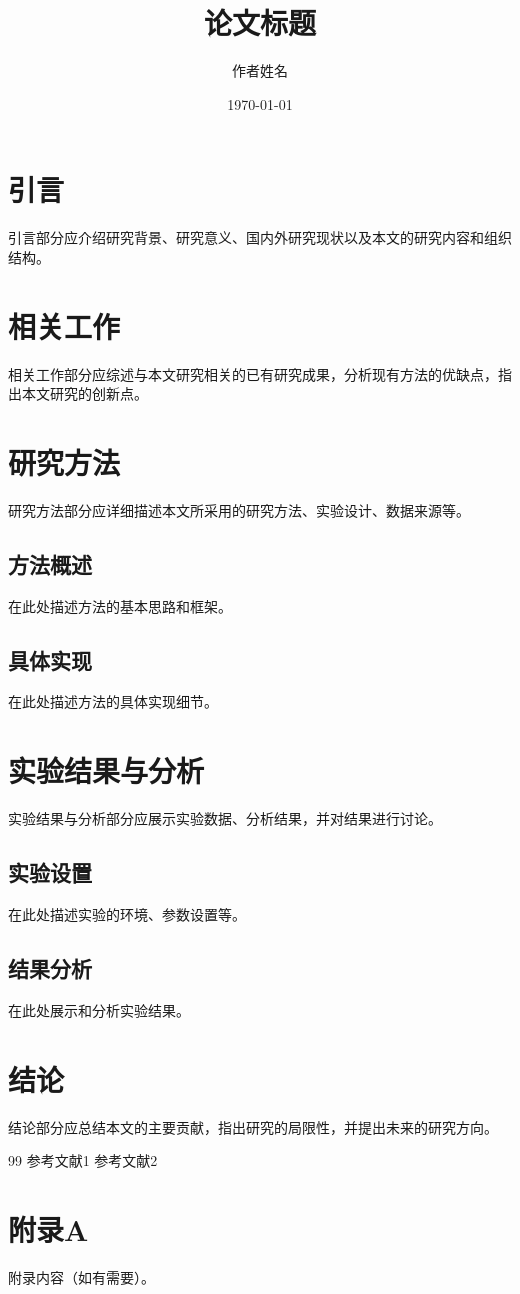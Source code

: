 \documentclass[12pt,a4paper,twocolumn]{article}
\title{论文标题}
\author{作者姓名}
\date{\today}
\begin{document}

\section{引言}
引言部分应介绍研究背景、研究意义、国内外研究现状以及本文的研究内容和组织结构。

\section{相关工作}
相关工作部分应综述与本文研究相关的已有研究成果，分析现有方法的优缺点，指出本文研究的创新点。

\section{研究方法}
研究方法部分应详细描述本文所采用的研究方法、实验设计、数据来源等。

\subsection{方法概述}
在此处描述方法的基本思路和框架。

\subsection{具体实现}
在此处描述方法的具体实现细节。

\section{实验结果与分析}
实验结果与分析部分应展示实验数据、分析结果，并对结果进行讨论。

\subsection{实验设置}
在此处描述实验的环境、参数设置等。

\subsection{结果分析}
在此处展示和分析实验结果。

\section{结论}
结论部分应总结本文的主要贡献，指出研究的局限性，并提出未来的研究方向。

\begin{thebibliography}{99}
 参考文献1
 参考文献2
\end{thebibliography}

\appendix
\section{附录A}
附录内容（如有需要）。
\end{document}
